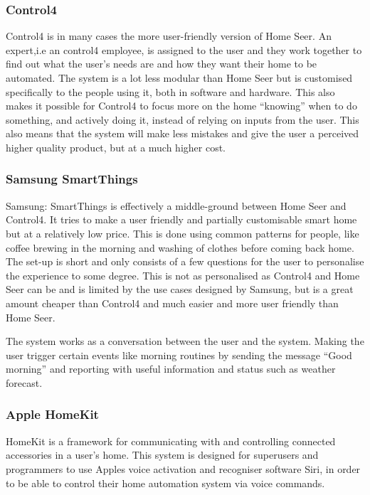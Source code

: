 \subsubsection{Control4}
Control4 is in many cases the more user-friendly version of Home Seer. An expert,i.e an control4 employee, is assigned to the user and they work together to find out what the user's needs are and how they want their home to be automated. The system is a lot less modular than Home Seer but is customised specifically to the people using it, both in software and hardware. This also makes it possible for Control4 to focus more on the home \enquote{knowing} when to do something, and actively doing it, instead of relying on inputs from the user. This also means that the system will make less mistakes and give the user a perceived higher quality product, but at a much higher cost.\cite{control4}

\subsubsection{Samsung SmartThings}
Samsung: SmartThings is effectively a middle-ground between Home Seer and Control4. It tries to make a user friendly and partially customisable smart home but at a relatively low price. This is done using common patterns for people, like coffee brewing in the morning and washing of clothes before coming back home. The set-up is short and only consists of a few questions for the user to personalise the experience to some degree. This is not as personalised as Control4 and Home Seer can be and is limited by the use cases designed by Samsung, but is a great amount cheaper than Control4 and much easier and more user friendly than Home Seer.

The system works as a conversation between the user and the system. Making the user trigger certain events like morning routines by sending the message \enquote{Good morning} and reporting with useful information and status such as weather forecast.

\subsubsection{Apple HomeKit}
HomeKit is a framework for communicating with and controlling connected accessories in a user's home. %
This system is designed for superusers and programmers to use Apples voice activation and recogniser software Siri, in order to be able to control their home automation system via voice commands.

